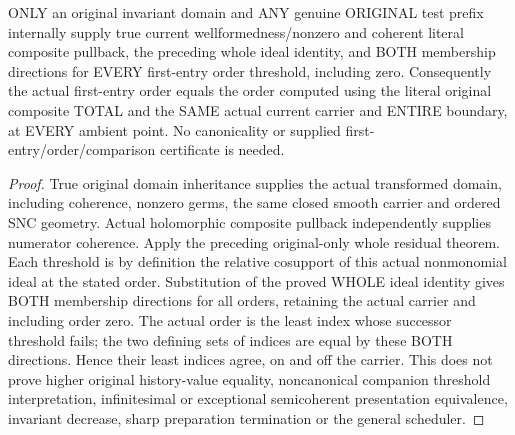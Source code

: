 \begin{theorem}
\label{hir:original-general-composite-residual-first-entry-thresholds}
\leanok
ONLY an original invariant domain and ANY genuine ORIGINAL test prefix
internally supply true current wellformedness/nonzero and coherent literal
composite pullback, the preceding whole ideal identity, and BOTH membership
directions for EVERY first-entry order threshold, including zero.
Consequently the actual first-entry order equals the order computed using
the literal original composite TOTAL and the SAME actual current carrier
and ENTIRE boundary, at EVERY ambient point. No canonicality or supplied
first-entry/order/comparison certificate is needed.
\end{theorem}
\begin{proof}
True original domain inheritance supplies the actual transformed domain,
including coherence, nonzero germs, the same closed smooth carrier and
ordered SNC geometry. Actual holomorphic composite pullback independently
supplies numerator coherence. Apply the preceding original-only whole
residual theorem. Each threshold is by definition the relative cosupport
of this actual nonmonomial ideal at the stated order. Substitution of the
proved WHOLE ideal identity gives BOTH membership directions for all
orders, retaining the actual carrier and including order zero. The actual
order is the least index whose successor threshold fails; the two defining
sets of indices are equal by these BOTH directions. Hence their least
indices agree, on and off the carrier. This does not prove higher original
history-value equality, noncanonical companion threshold interpretation,
infinitesimal or exceptional semicoherent presentation equivalence, invariant
decrease, sharp preparation termination or the general scheduler.
\end{proof}
